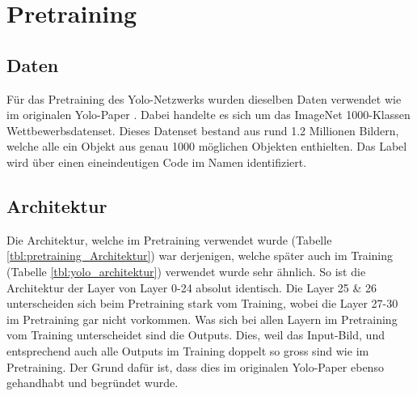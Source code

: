 \newpage
\section{Pretraining}
\label{chapter:Pretraining}

\subsection{Daten}
Für das Pretraining des Yolo-Netzwerks wurden dieselben Daten verwendet wie im originalen Yolo-Paper \cite{yolo}.
Dabei handelte es sich um das ImageNet 1000-Klassen Wettbewerbsdatenset.
Dieses Datenset bestand aus rund 1.2 Millionen Bildern, welche alle ein Objekt aus genau 1000 möglichen Objekten enthielten.
Das Label wird über einen eineindeutigen Code im Namen identifiziert.
\subsection{Architektur}
Die Architektur, welche im Pretraining verwendet wurde (Tabelle \ref{tbl:pretraining_Architektur}) war derjenigen, welche später auch im Training (Tabelle \ref{tbl:yolo_architektur}) verwendet wurde sehr ähnlich.
So ist die Architektur der Layer von Layer 0-24 absolut identisch. 
Die Layer 25 \& 26 unterscheiden sich beim Pretraining stark vom Training, wobei die Layer 27-30 im Pretraining gar nicht vorkommen.
Was sich bei allen Layern im Pretraining vom Training unterscheidet sind die Outputs. 
Dies, weil das Input-Bild, und entsprechend auch alle Outputs im Training doppelt so gross sind wie im Pretraining. 
Der Grund dafür ist, dass dies im originalen Yolo-Paper \cite{yolo} ebenso gehandhabt und begründet wurde.


